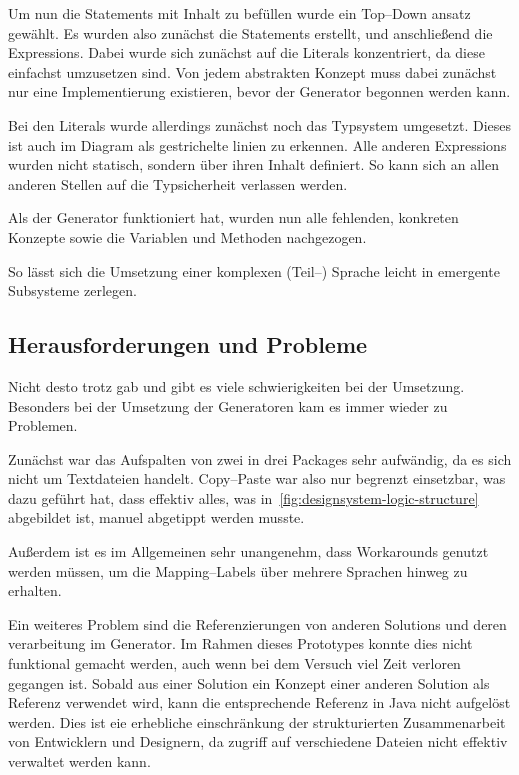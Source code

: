 Um nun die Statements mit Inhalt zu befüllen wurde ein Top--Down ansatz gewählt.
Es wurden also zunächst die Statements erstellt, und anschließend die Expressions.
Dabei wurde sich zunächst auf die Literals konzentriert, da diese einfachst umzusetzen sind.
Von jedem abstrakten Konzept muss dabei zunächst nur eine Implementierung existieren, bevor der Generator begonnen werden kann.

Bei den Literals wurde allerdings zunächst noch das Typsystem umgesetzt.
Dieses ist auch im Diagram als gestrichelte linien zu erkennen.
Alle anderen Expressions wurden nicht statisch, sondern über ihren Inhalt definiert.
So kann sich an allen anderen Stellen auf die Typsicherheit verlassen werden.

Als der Generator funktioniert hat, wurden nun alle fehlenden, konkreten Konzepte sowie die Variablen und Methoden nachgezogen.

So lässt sich die Umsetzung einer komplexen (Teil--) Sprache leicht in emergente Subsysteme zerlegen.

\subsection{Herausforderungen und Probleme}\label{subsec:herausforderungen-und-probleme}
Nicht desto trotz gab und gibt es viele schwierigkeiten bei der Umsetzung.
Besonders bei der Umsetzung der Generatoren kam es immer wieder zu Problemen.

Zunächst war das Aufspalten von zwei in drei Packages sehr aufwändig, da es sich nicht um Textdateien handelt.
Copy--Paste war also nur begrenzt einsetzbar, was dazu geführt hat, dass effektiv alles, was in~\autoref{fig:designsystem-logic-structure} abgebildet ist, manuel abgetippt werden musste.

Außerdem ist es im Allgemeinen sehr unangenehm, dass Workarounds genutzt werden müssen, um die Mapping--Labels über mehrere Sprachen hinweg zu erhalten.

Ein weiteres Problem sind die Referenzierungen von anderen Solutions und deren verarbeitung im Generator.
Im Rahmen dieses Prototypes konnte dies nicht funktional gemacht werden, auch wenn bei dem Versuch viel Zeit verloren gegangen ist.
Sobald aus einer Solution ein Konzept einer anderen Solution als Referenz verwendet wird, kann die entsprechende Referenz in Java nicht aufgelöst werden.
Dies ist eie erhebliche einschränkung der strukturierten Zusammenarbeit von Entwicklern und Designern, da zugriff auf verschiedene Dateien nicht effektiv verwaltet werden kann.
